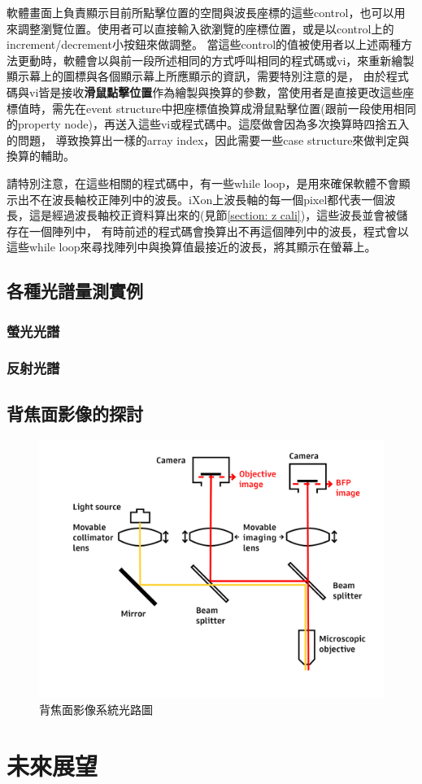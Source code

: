 \documentclass[12pt]{article}
\begin{document}
軟體畫面上負責顯示目前所點擊位置的空間與波長座標的這些control，也可以用來調整瀏覽位置。使用者可以直接輸入欲瀏覽的座標位置，或是以control上的increment/decrement小按鈕來做調整。
當這些control的值被使用者以上述兩種方法更動時，軟體會以與前一段所述相同的方式呼叫相同的程式碼或vi，來重新繪製顯示幕上的圖標與各個顯示幕上所應顯示的資訊，需要特別注意的是，
由於程式碼與vi皆是接收\textbf{滑鼠點擊位置}作為繪製與換算的參數，當使用者是直接更改這些座標值時，需先在event structure中把座標值換算成滑鼠點擊位置(跟前一段使用相同的property node)，再送入這些vi或程式碼中。這麼做會因為多次換算時四捨五入的問題，
導致換算出一樣的array index，因此需要一些case structure來做判定與換算的輔助。

請特別注意，在這些相關的程式碼中，有一些while loop，是用來確保軟體不會顯示出不在波長軸校正陣列中的波長。iXon上波長軸的每一個pixel都代表一個波長，這是經過波長軸校正資料算出來的(見節\ref{section: z cali})，這些波長並會被儲存在一個陣列中，
有時前述的程式碼會換算出不再這個陣列中的波長，程式會以這些while loop來尋找陣列中與換算值最接近的波長，將其顯示在螢幕上。
\subsection{各種光譜量測實例}
\subsubsection{螢光光譜}
\subsubsection{反射光譜}
\subsection{背焦面影像的探討}
\begin{figure}
    \centering
    \includegraphics[width = 0.75\linewidth]{lightPath3.jpg}
    \caption{背焦面影像系統光路圖}
\end{figure}
\section{未來展望}
\printbibliography
\end{document}
